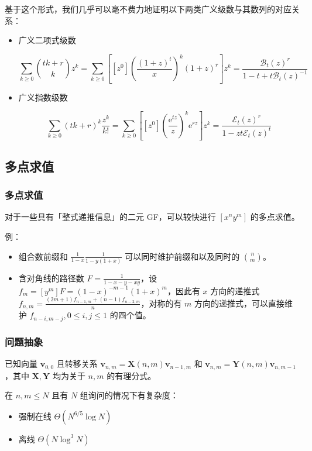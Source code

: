 \documentclass[mathserif]{ctexbeamer}
\newcommand{\me}{\mathrm{e}}
\begin{document}
\frame
{
  基于这个形式，我们几乎可以毫不费力地证明以下两类广义级数与其数列的对应关系：
  
  \begin{itemize}
  \item 广义二项式级数
  
  $$
  \sum_{k\ge0} \binom{tk+r}k z^k=
  \sum_{k\ge0} \left[[z^0]\left(\frac{(1+z)^t}{x}\right)^k(1+z)^r \right] z^k=\frac{\mathcal B_t(z)^r}{1-t+t\mathcal B_t(z)^{-1}}
  $$
  
  \item 广义指数级数
  
  $$
  \sum_{k\ge0} (tk+r)^k \frac{z^k}{k!} =\sum_{k\ge0} \left[ [z^0] \left(\frac{\me^{tz}}z\right)^k \me^{rz} \right] z^k=\frac{\mathcal E_t(z)^r}{1-zt \mathcal E_t(z)^t}
  $$
  \end{itemize}
}

\subsection{多点求值}
\frame
{
  \frametitle{多点求值}
  
  对于一些具有「整式递推信息」的二元 GF，可以较快进行 $[x^ny^m]$ 的多点求值。
  
  例：
  
  \begin{itemize}
  \item<1-> 组合数前缀和 $\frac 1{1-x} \frac 1{1-y(1+x)}$ 可以同时维护前缀和以及同时的 $\binom n m$。
  \item<2-> 含对角线的路径数 $F=\frac 1{1-x-y-xy}$，设 $f_m=[y^m]F=(1-x)^{-m-1}(1+x)^m$，因此有 $x$ 方向的递推式 $f_{n,m} = \frac{(2m+1)f_{n-1,m}+(n-1)f_{n-2,m}}n$，对称的有 $m$ 方向的递推式，可以直接维护 $f_{n-i,m-j},0\le i,j\le 1$ 的四个值。
  \end{itemize}
}

\frame
{
  \frametitle{问题抽象}
  
  已知向量 $\mathbf v_{0,0}$ 且转移关系 $\mathbf v_{n,m}=\mathbf X(n,m) \mathbf v_{n-1,m}$ 和 $\mathbf v_{n,m}=\mathbf Y(n,m) \mathbf v_{n,m-1}$，其中 $\mathbf {X,Y}$ 均为关于 $n,m$ 的有理分式。
}

\frame
{
  在 $n,m\le N$ 且有 $N$ 组询问的情况下有复杂度：
  \begin{itemize}
  \item 强制在线 $\Theta(N^{6/5}\log N)$
  \item 离线 $\Theta(N\log^3 N)$
  \end{itemize}
}
\end{document}
